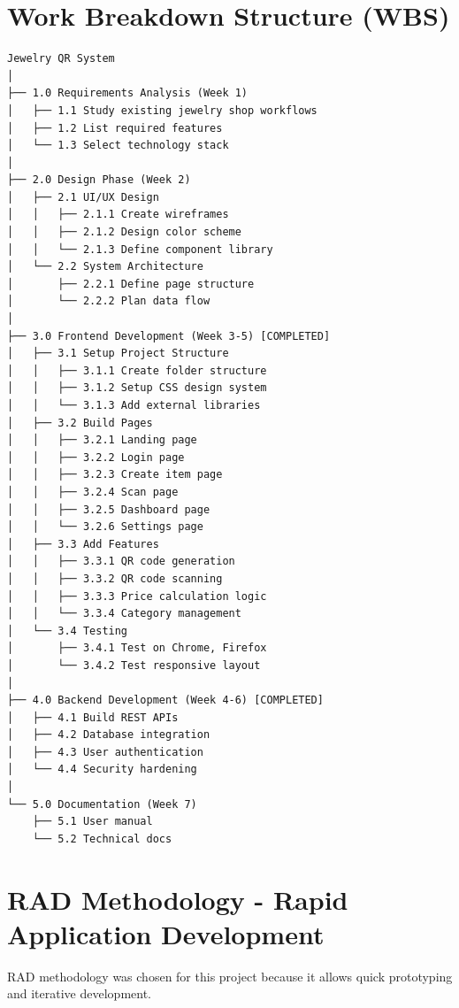 \documentclass[12pt,a4paper]{article}
\begin{document}
\section{Work Breakdown Structure (WBS)}

\begin{verbatim}
Jewelry QR System 
│ 
├── 1.0 Requirements Analysis (Week 1) 
│   ├── 1.1 Study existing jewelry shop workflows 
│   ├── 1.2 List required features 
│   └── 1.3 Select technology stack 
│ 
├── 2.0 Design Phase (Week 2) 
│   ├── 2.1 UI/UX Design 
│   │   ├── 2.1.1 Create wireframes 
│   │   ├── 2.1.2 Design color scheme 
│   │   └── 2.1.3 Define component library 
│   └── 2.2 System Architecture 
│       ├── 2.2.1 Define page structure 
│       └── 2.2.2 Plan data flow 
│ 
├── 3.0 Frontend Development (Week 3-5) [COMPLETED] 
│   ├── 3.1 Setup Project Structure 
│   │   ├── 3.1.1 Create folder structure 
│   │   ├── 3.1.2 Setup CSS design system 
│   │   └── 3.1.3 Add external libraries 
│   ├── 3.2 Build Pages 
│   │   ├── 3.2.1 Landing page 
│   │   ├── 3.2.2 Login page 
│   │   ├── 3.2.3 Create item page 
│   │   ├── 3.2.4 Scan page 
│   │   ├── 3.2.5 Dashboard page 
│   │   └── 3.2.6 Settings page 
│   ├── 3.3 Add Features 
│   │   ├── 3.3.1 QR code generation 
│   │   ├── 3.3.2 QR code scanning 
│   │   ├── 3.3.3 Price calculation logic 
│   │   └── 3.3.4 Category management 
│   └── 3.4 Testing 
│       ├── 3.4.1 Test on Chrome, Firefox 
│       └── 3.4.2 Test responsive layout 
│ 
├── 4.0 Backend Development (Week 4-6) [COMPLETED]
│   ├── 4.1 Build REST APIs 
│   ├── 4.2 Database integration 
│   ├── 4.3 User authentication
│   └── 4.4 Security hardening
│ 
└── 5.0 Documentation (Week 7) 
    ├── 5.1 User manual 
    └── 5.2 Technical docs
\end{verbatim}

\section{RAD Methodology - Rapid Application Development}

RAD methodology was chosen for this project because it allows quick prototyping and iterative development.
\end{document}
